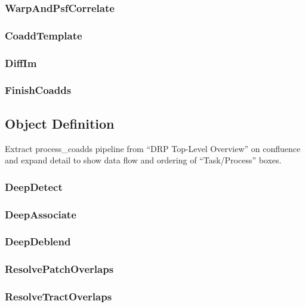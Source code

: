 \subsubsection{WarpAndPsfCorrelate}
\label{sec:drpWarpAndPsfCorrelate}
\subsubsection{CoaddTemplate}
\label{sec:drpCoaddTemplate}
\subsubsection{DiffIm}
\label{sec:drpDiffIm}
\subsubsection{FinishCoadds}
\label{sec:drpFinishCoadds}

\subsection{Object Definition}
\label{sec:drp_object_definition}

\begin{note}
Extract process\_coadds pipeline from ``DRP Top-Level Overview'' on confluence and expand detail to show data flow and ordering of ``Task/Process'' boxes.
\end{note}

\subsubsection{DeepDetect}
\label{sec:drpDeepDetect}
\subsubsection{DeepAssociate}
\label{sec:drpDeepAssociate}
\subsubsection{DeepDeblend}
\label{sec:drpDeepDeblend}
\subsubsection{ResolvePatchOverlaps}
\label{sec:drpResolvePatchOverlaps}
\subsubsection{ResolveTractOverlaps}
\label{sec:drpResolveTractOverlaps}

